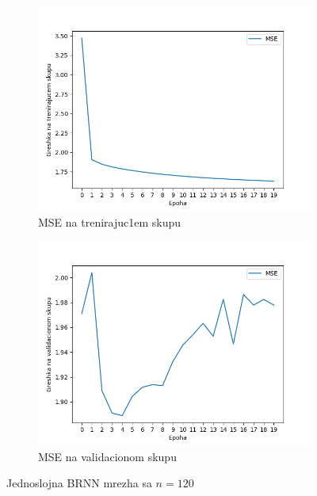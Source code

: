 \documentclass[a4paper, openany, oneside, 11pt]{book}
\begin{document}
\newpage
\begin{figure}[!h]
        \centering
        \begin{subfigure}{0.475\textwidth}
            \centering
            \includegraphics[scale=0.45]{res/SL_BLSTM_120units_d00_train.png}
            \caption{\acrshort{MSE} na trenirajuc1em skupu}
            \label{fig:4_9a}
            \vspace{0pt}
        \end{subfigure}%
        \begin{subfigure}{0.475\textwidth}
            \centering
            \includegraphics[scale=0.45]{res/SL_BLSTM_120units_d00_validation.png}
            \caption{\acrshort{MSE} na validacionom skupu}
            \label{fig:4_9b}
            \vspace{0pt}
        \end{subfigure}
        \caption{Jednoslojna \acrshort{BRNN} mrezha sa $n=120$}
        \label{fig:4_9}
\end{figure}
\end{document}
